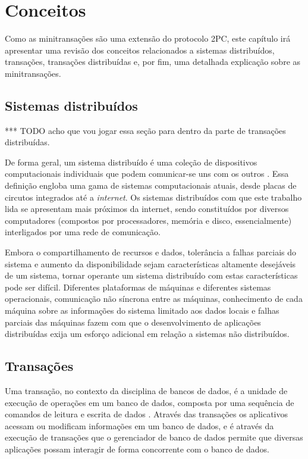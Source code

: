 \documentclass[11pt,twoside,a4paper]{book}
\begin{document}
\chapter{Conceitos}
\label{chap:conceitos}
Como as minitransações são uma extensão do protocolo 2PC, este capítulo irá apresentar uma revisão dos conceitos relacionados a sistemas distribuídos, transações, transações distribuídas e, por fim, uma detalhada explicação sobre as minitransações.

\section{Sistemas distribuídos}
\label{sec:sistemas_distribuidos}
*** TODO acho que vou jogar essa seção para dentro da parte de transações distribuídas.

De forma geral, um sistema distribuído é uma coleção de dispositivos computacionais individuais que podem comunicar-se uns com os outros \cite{distributed_computing}. Essa definição engloba uma gama de sistemas computacionais atuais, desde placas de circutos integrados até a \emph{internet}. Os sistemas distribuídos com que este trabalho lida se apresentam mais próximos da internet, sendo constituídos por diversos computadores (compostos por processadores, memória e disco, essencialmente) interligados por uma rede de comunicação.

Embora o compartilhamento de recursos e dados, tolerância a falhas parciais do sistema e aumento da disponibilidade sejam características altamente desejáveis de um sistema, tornar operante um sistema distribuído com estas características pode ser difícil. Diferentes plataformas de máquinas e diferentes sistemas operacionais, comunicação não síncrona entre as máquinas, conhecimento de cada máquina sobre as informações do sistema limitado aos dados locais e falhas parciais das máquinas fazem com que o desenvolvimento de aplicações distribuídas exija um esforço adicional em relação a sistemas não distribuídos.

\section{Transações}
\label{sec:transacoes}
Uma transação, no contexto da disciplina de bancos de dados, é a unidade de execução de operações em um banco de dados, composta por uma sequência de comandos de leitura e escrita de dados \cite{garcia-molina}\cite{vaca}. Através das transações os aplicativos acessam ou modificam informações em um banco de dados, e é através da execução de transações que o gerenciador de banco de dados permite que diversas aplicações possam interagir de forma concorrente com o banco de dados.
\end{document}
